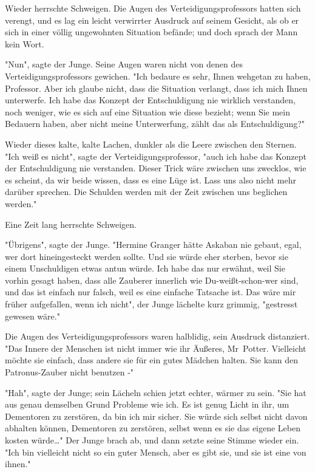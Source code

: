 {Wieder herrschte Schweigen. Die Augen des Verteidigungsprofessors hatten sich verengt, und es lag ein leicht verwirrter Ausdruck auf seinem Gesicht, als ob er sich in einer völlig ungewohnten Situation befände; und doch sprach der Mann kein Wort.

"Nun", sagte der Junge. Seine Augen waren nicht von denen des Verteidigungsprofessors gewichen. "Ich bedaure es sehr, Ihnen wehgetan zu haben, Professor. Aber ich glaube nicht, dass die Situation verlangt, dass ich mich Ihnen unterwerfe. Ich habe das Konzept der Entschuldigung nie wirklich verstanden, noch weniger, wie es sich auf eine Situation wie diese bezieht; wenn Sie mein Bedauern haben, aber nicht meine Unterwerfung, zählt das als Entschuldigung?"

Wieder dieses kalte, kalte Lachen, dunkler als die Leere zwischen den Sternen. "Ich weiß es nicht", sagte der Verteidigungsprofessor, "auch ich habe das Konzept der Entschuldigung nie verstanden. Dieser Trick wäre zwischen uns zwecklos, wie es scheint, da wir beide wissen, dass es eine Lüge ist. Lass uns also nicht mehr darüber sprechen. Die Schulden werden mit der Zeit zwischen uns beglichen werden."

Eine Zeit lang herrschte Schweigen.

"Übrigens", sagte der Junge. "Hermine Granger hätte Askaban nie gebaut, egal, wer dort hineingesteckt werden sollte. Und sie würde eher sterben, bevor sie einem Unschuldigen etwas antun würde. Ich habe das nur erwähnt, weil Sie vorhin gesagt haben, dass alle Zauberer innerlich wie Du-weißt-schon-wer sind, und das ist einfach nur falsch, weil es eine einfache Tatsache ist. Das wäre mir früher aufgefallen, wenn ich nicht", der Junge lächelte kurz grimmig, "gestresst gewesen wäre."

Die Augen des Verteidigungsprofessors waren halblidig, sein Ausdruck distanziert. "Das Innere der Menschen ist nicht immer wie ihr Äußeres, Mr~Potter. Vielleicht möchte sie einfach, dass andere sie für ein gutes Mädchen halten. Sie kann den Patronus-Zauber nicht benutzen -"

"Hah", sagte der Junge; sein Lächeln schien jetzt echter, wärmer zu sein. "Sie hat aus genau demselben Grund Probleme wie ich. Es ist genug Licht in ihr, um Dementoren zu zerstören, da bin ich mir sicher. Sie würde sich selbst nicht davon abhalten können, Dementoren zu zerstören, selbst wenn es sie das eigene Leben kosten würde…" Der Junge brach ab, und dann setzte seine Stimme wieder ein. "Ich bin vielleicht nicht so ein guter Mensch, aber es gibt sie, und sie ist eine von ihnen."

}
